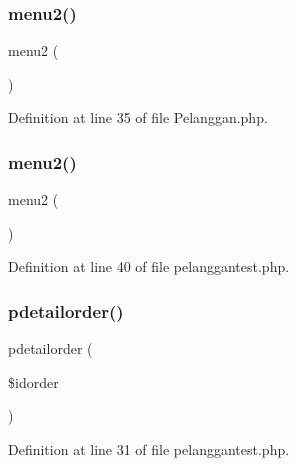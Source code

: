 \subsubsection{\texorpdfstring{menu2()}{menu2()}\hspace{0.1cm}{\footnotesize\ttfamily [1/2]}}
{\footnotesize\ttfamily menu2 (\begin{DoxyParamCaption}{ }\end{DoxyParamCaption})}



Definition at line 35 of file Pelanggan.\+php.

\mbox{\label{class_pelanggan_ad2c26cff98a5f9db6b4dec1edc8ada7b}} 
\subsubsection{\texorpdfstring{menu2()}{menu2()}\hspace{0.1cm}{\footnotesize\ttfamily [2/2]}}
{\footnotesize\ttfamily menu2 (\begin{DoxyParamCaption}{ }\end{DoxyParamCaption})}



Definition at line 40 of file pelanggantest.\+php.

\mbox{\label{class_pelanggan_ac0d0060fbc0a51ad837bfe7469e0f054}} 
\subsubsection{\texorpdfstring{pdetailorder()}{pdetailorder()}\hspace{0.1cm}{\footnotesize\ttfamily [1/2]}}
{\footnotesize\ttfamily pdetailorder (\begin{DoxyParamCaption}\item[{}]{\$idorder }\end{DoxyParamCaption})}



Definition at line 31 of file pelanggantest.\+php.

\mbox{\label{class_pelanggan_abf13866356efd4ebc95ca03b7429520f}} 
